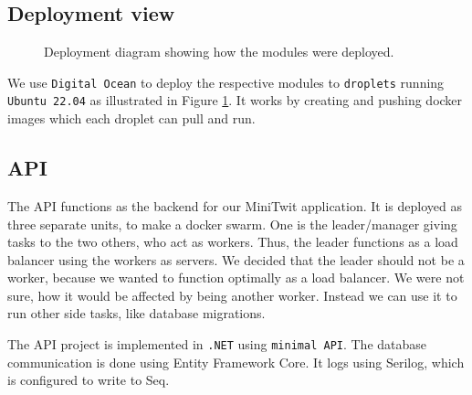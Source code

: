 \subsection{Deployment view}

\begin{figure}[H]
      \centering
      \caption{Deployment diagram showing how the modules were deployed.}
      \label{fig:deployment_diagram}
\end{figure}

We use \texttt{Digital Ocean} to deploy the respective modules to \texttt{droplets} running \texttt{Ubuntu 22.04} as illustrated in Figure \ref{fig:deployment_diagram}. It works by creating and pushing docker images which each droplet can pull and run.

\subsection{API}

The API functions as the backend for our MiniTwit application.
It is deployed as three separate units, to make a docker swarm. 
One is the leader/manager giving tasks to 
the two others, who act as workers. 
Thus, the leader functions as a load balancer using the workers as servers.
We decided that the leader should not be a worker,
because we wanted to function optimally as a load balancer.
We were not sure, how it would be affected by being another worker.
Instead we can use it to run other side tasks, like database migrations.

The API project is implemented in \texttt{.NET} using \texttt{minimal API}\cite{minimalApi}.
The database communication is done using Entity Framework Core.
It logs using Serilog\cite{serilog}, 
which is configured to write to Seq\cite{seq}.

